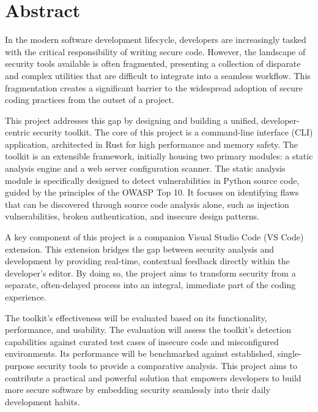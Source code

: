 %
%
\chapter{Abstract}
\begin{SingleSpace}
In the modern software development lifecycle, developers are increasingly tasked with the critical responsibility of writing secure code. However, the landscape of security tools available is often fragmented, presenting a collection of disparate and complex utilities that are difficult to integrate into a seamless workflow. This fragmentation creates a significant barrier to the widespread adoption of secure coding practices from the outset of a project.

This project addresses this gap by designing and building a unified, developer-centric security toolkit. The core of this project is a command-line interface (CLI) application, architected in Rust for high performance and memory safety. The toolkit is an extensible framework, initially housing two primary modules: a static analysis engine and a web server configuration scanner. The static analysis module is specifically designed to detect vulnerabilities in Python source code, guided by the principles of the OWASP Top 10. It focuses on identifying flaws that can be discovered through source code analysis alone, such as injection vulnerabilities, broken authentication, and insecure design patterns.

A key component of this project is a companion Visual Studio Code (VS Code) extension. This extension bridges the gap between security analysis and development by providing real-time, contextual feedback directly within the developer's editor. By doing so, the project aims to transform security from a separate, often-delayed process into an integral, immediate part of the coding experience.

The toolkit's effectiveness will be evaluated based on its functionality, performance, and usability. The evaluation will assess the toolkit's detection capabilities against curated test cases of insecure code and misconfigured environments. Its performance will be benchmarked against established, single-purpose security tools to provide a comparative analysis. This project aims to contribute a practical and powerful solution that empowers developers to build more secure software by embedding security seamlessly into their daily development habits.
\end{SingleSpace}

